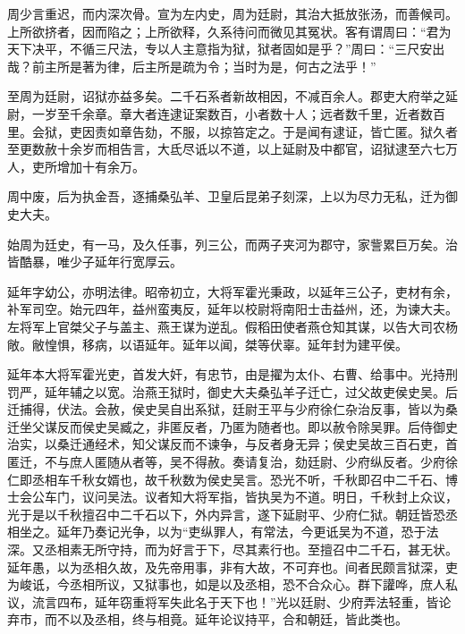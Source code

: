 \documentclass[12pt,UTF8]{ctexbook}
\begin{document}
周少言重迟，而内深次骨。宣为左内史，周为廷尉，其治大抵放张汤，而善候司。上所欲挤者，因而陷之；上所欲释，久系待问而微见其冤状。客有谓周曰：“君为天下决平，不循三尺法，专以人主意指为狱，狱者固如是乎？”周曰：“三尺安出哉？前主所是著为律，后主所是疏为令；当时为是，何古之法乎！”



至周为廷尉，诏狱亦益多矣。二千石系者新故相因，不减百余人。郡吏大府举之延尉，一岁至千余章。章大者连逮证案数百，小者数十人；远者数千里，近者数百里。会狱，吏因责如章告劾，不服，以掠笞定之。于是闻有逮证，皆亡匿。狱久者至更数赦十余岁而相告言，大氐尽诋以不道，以上延尉及中都官，诏狱逮至六七万人，吏所增加十有余万。



周中废，后为执金吾，逐捕桑弘羊、卫皇后昆弟子刻深，上以为尽力无私，迁为御史大夫。



始周为廷史，有一马，及久任事，列三公，而两子夹河为郡守，家訾累巨万矣。治皆酷暴，唯少子延年行宽厚云。



延年字幼公，亦明法律。昭帝初立，大将军霍光秉政，以延年三公子，吏材有余，补军司空。始元四年，益州蛮夷反，延年以校尉将南阳士击益州，还，为谏大夫。左将军上官桀父子与盖主、燕王谋为逆乱。假稻田使者燕仓知其谋，以告大司农杨敞。敝惶惧，移病，以语延年。延年以闻，桀等伏辜。延年封为建平侯。



延年本大将军霍光吏，首发大奸，有忠节，由是擢为太仆、右曹、给事中。光持刑罚严，延年辅之以宽。治燕王狱时，御史大夫桑弘羊子迁亡，过父故吏侯史吴。后迁捕得，伏法。会赦，侯史吴自出系狱，廷尉王平与少府徐仁杂治反事，皆以为桑迁坐父谋反而侯史吴臧之，非匿反者，乃匿为随者也。即以赦令除吴罪。后侍御史治实，以桑迁通经术，知父谋反而不谏争，与反者身无异；侯史吴故三百石吏，首匿迁，不与庶人匿随从者等，吴不得赦。奏请复治，劾廷尉、少府纵反者。少府徐仁即丞相车千秋女婿也，故千秋数为侯史吴言。恐光不听，千秋即召中二千石、博士会公车门，议问吴法。议者知大将军指，皆执吴为不道。明日，千秋封上众议，光于是以千秋擅召中二千石以下，外内异言，遂下延尉平、少府仁狱。朝廷皆恐丞相坐之。延年乃奏记光争，以为“吏纵罪人，有常法，今更诋吴为不道，恐于法深。又丞相素无所守持，而为好言于下，尽其素行也。至擅召中二千石，甚无状。延年愚，以为丞相久故，及先帝用事，非有大故，不可弃也。间者民颇言狱深，吏为峻诋，今丞相所议，又狱事也，如是以及丞相，恐不合众心。群下讙哗，庶人私议，流言四布，延年窃重将军失此名于天下也！”光以廷尉、少府弄法轻重，皆论弃市，而不以及丞相，终与相竟。延年论议持平，合和朝廷，皆此类也。
\end{document}
